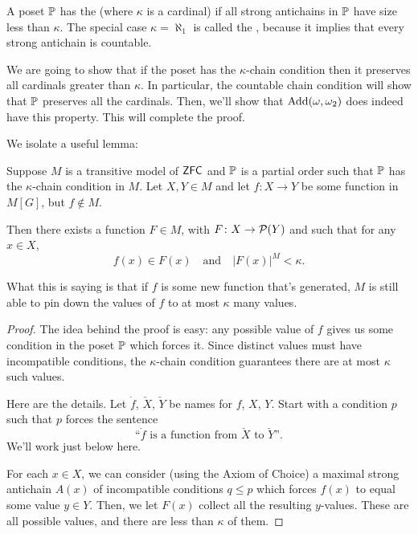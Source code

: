 \begin{definition}
	A poset $\mathbb P$ has the 
	(where $\kappa$ is a cardinal) if all strong antichains
	in $\mathbb P$ have size less than $\kappa$.
	The special case $\kappa = \aleph_1$ is called the ,
	because it implies that every strong antichain is countable.
\end{definition}

We are going to show that if the poset has the $\kappa$-chain condition
then it preserves all cardinals greater than $\kappa$.
In particular, the countable chain condition will show that $\mathbb P$ preserves all the cardinals.
Then, we'll show that $\operatorname{Add}(\omega, \omega_2)$ does indeed have this property.
This will complete the proof.

We isolate a useful lemma:
\begin{lemma}
	Suppose $M$ is a transitive model of $\mathsf{ZFC}$ and $\mathbb P$ is a partial order
	such that $\mathbb P$ has the $\kappa$-chain condition in $M$.
	Let $X,Y \in M$ and let $f \colon X \to Y$
	be some function in $M[G]$, but $f \notin M$.

	Then there exists a function $F \in M$, with $F \colon X \to \mathcal P(Y)$ and such that
	for any $x \in X$,
	\[ f(x) \in F(x) \quad\text{and}\quad \left\lvert F(x) \right\rvert^M < \kappa. \]
\end{lemma}
What this is saying is that if $f$ is some new function that's generated,
$M$ is still able to pin down the values of $f$ to at most $\kappa$ many values.

\begin{proof}
	The idea behind the proof is easy: any possible value of $f$ gives us some condition in
	the poset $\mathbb P$ which forces it.
	Since distinct values must have incompatible conditions,
	the $\kappa$-chain condition guarantees
	there are at most $\kappa$ such values.

	Here are the details.
	Let $\dot f$, $\check X$, $\check Y$ be names for $f$, $X$, $Y$.
	Start with a condition $p$ such that $p$ forces the sentence
	\[ \text{``$\dot f$ is a function from $\check X$ to $\check Y$''}. \]
	We'll work just below here.

	For each $x \in X$, we can consider (using the Axiom of Choice) a maximal strong antichain $A(x)$
	of incompatible conditions $q \le p$ which forces $f(x)$ to equal some value $y \in Y$.
	Then, we let $F(x)$ collect all the resulting $y$-values.
	These are all possible values, and there are less than $\kappa$ of them.
\end{proof}

